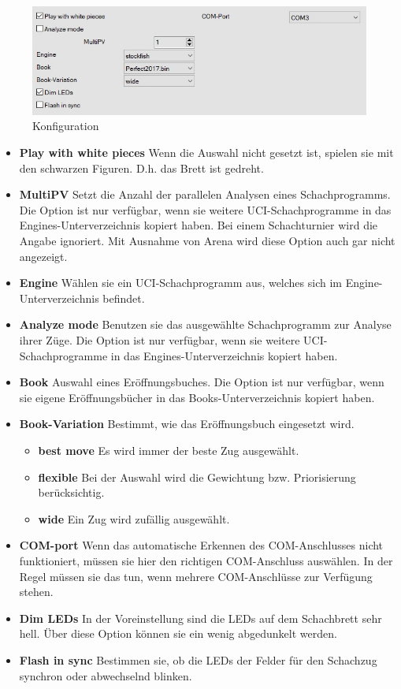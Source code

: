 \documentclass[11pt,a4paper]{article}
\begin{document}
\begin{figure}[H]
	\centering
	\includegraphics[scale=0.7]{configuration.jpg}
	\caption{Konfiguration}
	\label{fig:configration}
\end{figure}
\begin{itemize}

	\item \textbf{Play with white pieces} Wenn die Auswahl nicht gesetzt ist, spielen sie mit den schwarzen Figuren. D.h. das Brett ist gedreht.

	\item \textbf{MultiPV} Setzt die Anzahl der parallelen Analysen eines Schachprogramms. Die Option ist nur verfügbar, wenn sie weitere UCI-Schachprogramme in das Engines-Unterverzeichnis kopiert haben. Bei einem Schachturnier wird die Angabe ignoriert. Mit Ausnahme von Arena wird diese Option auch gar nicht angezeigt.
	
	\item \textbf{Engine} Wählen sie ein UCI-Schachprogramm aus, welches sich im Engine-Unterverzeichnis befindet.

    \item \textbf{Analyze mode} Benutzen sie das ausgewählte Schachprogramm zur Analyse ihrer Züge. Die Option ist nur verfügbar, wenn sie weitere UCI-Schachprogramme in das Engines-Unterverzeichnis kopiert haben.
    
    \item \textbf{Book} Auswahl eines Eröffnungsbuches. Die Option ist nur verfügbar, wenn sie eigene Eröffnungsbücher in das Books-Unterverzeichnis kopiert haben.
   \item \textbf{Book-Variation} Bestimmt, wie das Eröffnungsbuch eingesetzt wird.
   \begin{itemize}
   	  \item \textbf{best move} Es wird immer der beste Zug ausgewählt.
   	  \item \textbf{flexible} Bei der Auswahl wird die Gewichtung bzw. Priorisierung berücksichtig.   	  \item \textbf{wide} Ein Zug wird zufällig ausgewählt. 
   \end{itemize}
    \item \textbf{COM-port} Wenn das automatische Erkennen des COM-Anschlusses nicht funktioniert, müssen sie hier den richtigen COM-Anschluss auswählen. In der Regel müssen sie das tun, wenn mehrere COM-Anschlüsse zur Verfügung stehen.
    \item \textbf{Dim LEDs} In der Voreinstellung sind die LEDs auf dem Schachbrett sehr hell. Über diese Option können sie ein wenig abgedunkelt werden.
    \item \textbf{Flash in sync} Bestimmen sie, ob die LEDs der Felder für den Schachzug synchron oder abwechselnd blinken.


\end{itemize}
\end{document}
